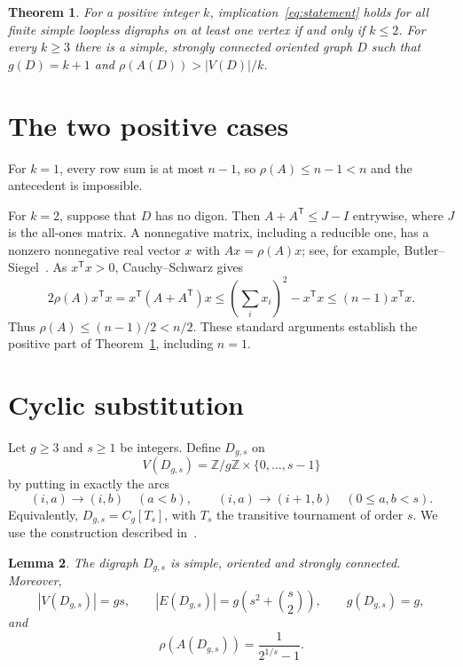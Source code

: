 \documentclass[11pt]{article}
\newtheorem{theorem}{Theorem}
\newtheorem{lemma}[theorem]{Lemma}
\begin{document}
\begin{theorem}\label{thm:main}
For a positive integer $k$, implication~\eqref{eq:statement} holds for all finite simple loopless digraphs on at least one vertex if and only if $k\leq2$. For every $k\geq3$ there is a simple, strongly connected oriented graph $D$ such that $g(D)=k+1$ and $\rho(A(D))>|V(D)|/k$.
\end{theorem}

\section{The two positive cases}

For $k=1$, every row sum is at most $n-1$, so $\rho(A)\leq n-1<n$ and the antecedent is impossible.

For $k=2$, suppose that $D$ has no digon. Then $A+A^{\mathsf T}\leq J-I$ entrywise, where $J$ is the all-ones matrix. A nonnegative matrix, including a reducible one, has a nonzero nonnegative real vector $x$ with $Ax=\rho(A)x$; see, for example, Butler--Siegel~\cite[Remark~3.1]{butler}. As $x^{\mathsf T}x>0$, Cauchy--Schwarz gives
\[
 2\rho(A)x^{\mathsf T}x
 =x^{\mathsf T}(A+A^{\mathsf T})x
 \leq\left(\sum_i x_i\right)^2-x^{\mathsf T}x
 \leq(n-1)x^{\mathsf T}x.
\]
Thus $\rho(A)\leq(n-1)/2<n/2$. These standard arguments establish the positive part of Theorem~\ref{thm:main}, including $n=1$.

\section{Cyclic substitution}

Let $g\geq3$ and $s\geq1$ be integers. Define $D_{g,s}$ on
\[
 V(D_{g,s})=\mathbb Z/g\mathbb Z\times\{0,\ldots,s-1\}
\]
by putting in exactly the arcs
\begin{equation}\label{eq:arcs}
 (i,a)\to(i,b)\quad(a<b),\qquad
 (i,a)\to(i+1,b)\quad(0\leq a,b<s).
\end{equation}
Equivalently, $D_{g,s}=C_g[T_s]$, with $T_s$ the transitive tournament of order $s$. We use the construction described in~\cite{css,aharoni}.

\begin{lemma}\label{lem:family}
The digraph $D_{g,s}$ is simple, oriented and strongly connected. Moreover,
\[
 |V(D_{g,s})|=gs,\qquad
 |E(D_{g,s})|=g\left(s^2+\binom{s}{2}\right),\qquad
 g(D_{g,s})=g,
\]
and
\begin{equation}\label{eq:radius}
 \rho(A(D_{g,s}))=\frac{1}{2^{1/s}-1}.
\end{equation}
\end{lemma}
\end{document}
